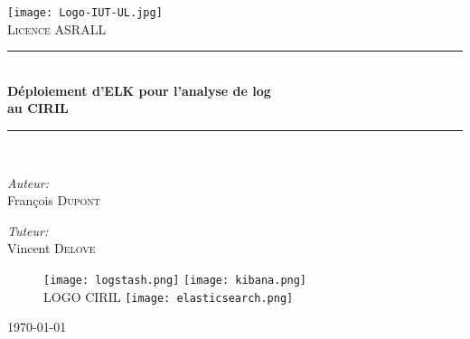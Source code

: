 \begin{titlepage}
\begin{center}
 \newcommand{\HRule}{\rule{\linewidth}{0.5mm}}

\texttt{[image: Logo-IUT-UL.jpg]}\\[1cm]


\textsc{\LARGE Licence ASRALL}\\[0.5cm]

\HRule \\[0.4cm]
{ \huge \bfseries Déploiement d'ELK pour l'analyse de log\\
au CIRIL\\[0.4cm] }

\HRule \\[1.5cm]

\noindent
\begin{minipage}{0.5\textwidth}
\begin{flushleft} \large
\emph{Auteur:}\\
François \textsc{Dupont}\\
\end{flushleft}
\end{minipage}%
\begin{minipage}{0.5\textwidth}
\begin{flushright} \large
\emph{Tuteur:} \\
Vincent \textsc{Delove}
\end{flushright}
\end{minipage}

%

\vfill

\begin{figure}[h]
    \centering
    \texttt{[image: logstash.png]}
    \hfill
    \texttt{[image: kibana.png]}
    \\[0.2cm]
    LOGO CIRIL
    \texttt{[image: elasticsearch.png]}
\end{figure}

\vfill
{\Large \today}%

\end{center}
\end{titlepage}

